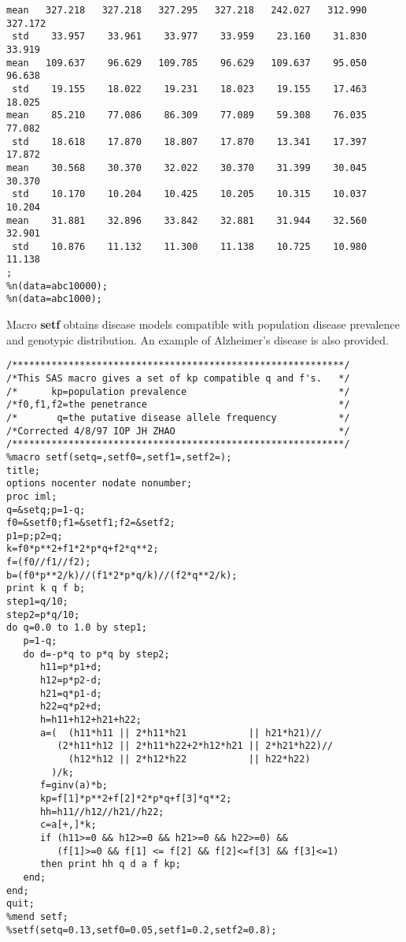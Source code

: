 \begin{verbatim}
mean   327.218   327.218   327.295   327.218   242.027   312.990   327.172
 std    33.957    33.961    33.977    33.959    23.160    31.830    33.919
mean   109.637    96.629   109.785    96.629   109.637    95.050    96.638
 std    19.155    18.022    19.231    18.023    19.155    17.463    18.025
mean    85.210    77.086    86.309    77.089    59.308    76.035    77.082
 std    18.618    17.870    18.807    17.870    13.341    17.397    17.872
mean    30.568    30.370    32.022    30.370    31.399    30.045    30.370
 std    10.170    10.204    10.425    10.205    10.315    10.037    10.204
mean    31.881    32.896    33.842    32.881    31.944    32.560    32.901
 std    10.876    11.132    11.300    11.138    10.725    10.980    11.138
;
%n(data=abc10000);
%n(data=abc1000);
\end{verbatim}

\noindent Macro {\bf setf} obtains disease models compatible with population
disease prevalence and genotypic distribution.  An example of Alzheimer's
disease is also provided.
\begin{verbatim}
/***********************************************************/
/*This SAS macro gives a set of kp compatible q and f's.   */
/*      kp=population prevalence                           */
/*f0,f1,f2=the penetrance                                  */
/*       q=the putative disease allele frequency           */
/*Corrected 4/8/97 IOP JH ZHAO                             */
/***********************************************************/
%macro setf(setq=,setf0=,setf1=,setf2=);
title;
options nocenter nodate nonumber;
proc iml;
q=&setq;p=1-q;
f0=&setf0;f1=&setf1;f2=&setf2;
p1=p;p2=q;
k=f0*p**2+f1*2*p*q+f2*q**2;
f=(f0//f1//f2);
b=(f0*p**2/k)//(f1*2*p*q/k)//(f2*q**2/k);
print k q f b;
step1=q/10;
step2=p*q/10;
do q=0.0 to 1.0 by step1;
   p=1-q;
   do d=-p*q to p*q by step2;
      h11=p*p1+d;
      h12=p*p2-d;
      h21=q*p1-d;
      h22=q*p2+d;
      h=h11+h12+h21+h22;
      a=(  (h11*h11 || 2*h11*h21           || h21*h21)//
         (2*h11*h12 || 2*h11*h22+2*h12*h21 || 2*h21*h22)//
           (h12*h12 || 2*h12*h22           || h22*h22)
        )/k;
      f=ginv(a)*b;
      kp=f[1]*p**2+f[2]*2*p*q+f[3]*q**2;
      hh=h11//h12//h21//h22;
      c=a[+,]*k;
      if (h11>=0 && h12>=0 && h21>=0 && h22>=0) &&
         (f[1]>=0 && f[1] <= f[2] && f[2]<=f[3] && f[3]<=1)
      then print hh q d a f kp;
   end;
end;
quit;
%mend setf;
%setf(setq=0.13,setf0=0.05,setf1=0.2,setf2=0.8);
\end{verbatim}


